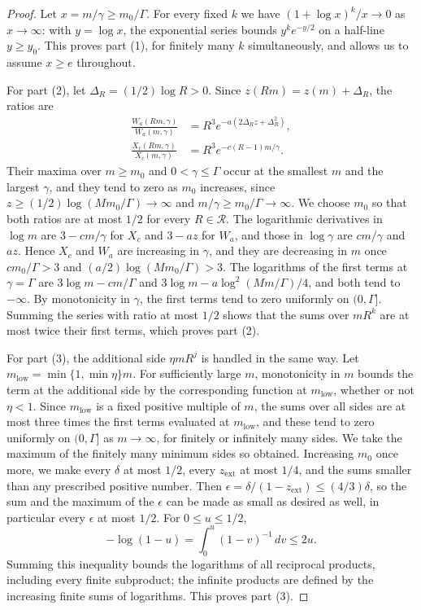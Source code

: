 \begin{proof}
Let $x=m/\gamma\ge m_0/\Gamma$. For every fixed $k$ we have $(1+\log x)^k/x\to0$ as $x\to\infty$: with $y=\log x$, the exponential series bounds $y^ke^{-y/2}$ on a half-line $y\ge y_0$. This proves part (1), for finitely many $k$ simultaneously, and allows us to assume $x\ge e$ throughout.

For part (2), let $\Delta_R=(1/2)\log R>0$. Since $z(Rm)=z(m)+\Delta_R$, the ratios are
\begin{align}
 \frac{W_a(Rm,\gamma)}{W_a(m,\gamma)}&=R^3e^{-a(2\Delta_Rz+\Delta_R^2)},\label{ch17:eq:white-ratio}\\
 \frac{X_c(Rm,\gamma)}{X_c(m,\gamma)}&=R^3e^{-c(R-1)m/\gamma}.\label{ch17:eq:exterior-ratio}
\end{align}
Their maxima over $m\ge m_0$ and $0<\gamma\le\Gamma$ occur at the smallest $m$ and the largest $\gamma$, and they tend to zero as $m_0$ increases, since $z\ge(1/2)\log(Mm_0/\Gamma)\to\infty$ and $m/\gamma\ge m_0/\Gamma\to\infty$. We choose $m_0$ so that both ratios are at most $1/2$ for every $R\in\mathcal R$. The logarithmic derivatives in $\log m$ are $3-cm/\gamma$ for $X_c$ and $3-az$ for $W_a$, and those in $\log\gamma$ are $cm/\gamma$ and $az$. Hence $X_c$ and $W_a$ are increasing in $\gamma$, and they are decreasing in $m$ once $cm_0/\Gamma>3$ and $(a/2)\log(Mm_0/\Gamma)>3$. The logarithms of the first terms at $\gamma=\Gamma$ are $3\log m-cm/\Gamma$ and $3\log m-a\log^2(Mm/\Gamma)/4$, and both tend to $-\infty$. By monotonicity in $\gamma$, the first terms tend to zero uniformly on $(0,\Gamma]$. Summing the series with ratio at most $1/2$ shows that the sums over $mR^k$ are at most twice their first terms, which proves part (2).

For part (3), the additional side $\eta mR^j$ is handled in the same way. Let $m_{\mathrm{low}}=\min\{1,\min\eta\}m$. For sufficiently large $m$, monotonicity in $m$ bounds the term at the additional side by the corresponding function at $m_{\mathrm{low}}$, whether or not $\eta<1$. Since $m_{\mathrm{low}}$ is a fixed positive multiple of $m$, the sums over all sides are at most three times the first terms evaluated at $m_{\mathrm{low}}$, and these tend to zero uniformly on $(0,\Gamma]$ as $m\to\infty$, for finitely or infinitely many sides. We take the maximum of the finitely many minimum sides so obtained. Increasing $m_0$ once more, we make every $\delta$ at most $1/2$, every $z_{\mathrm{ext}}$ at most $1/4$, and the sums smaller than any prescribed positive number. Then $\epsilon=\delta/(1-z_{\mathrm{ext}})\le(4/3)\delta$, so the sum and the maximum of the $\epsilon$ can be made as small as desired as well, in particular every $\epsilon$ at most $1/2$. For $0\le u\le1/2$,
\[
 -\log(1-u)=\int_0^u(1-v)^{-1}\,dv\le2u.
\]
Summing this inequality bounds the logarithms of all reciprocal products, including every finite subproduct; the infinite products are defined by the increasing finite sums of logarithms. This proves part (3).


\end{proof}
